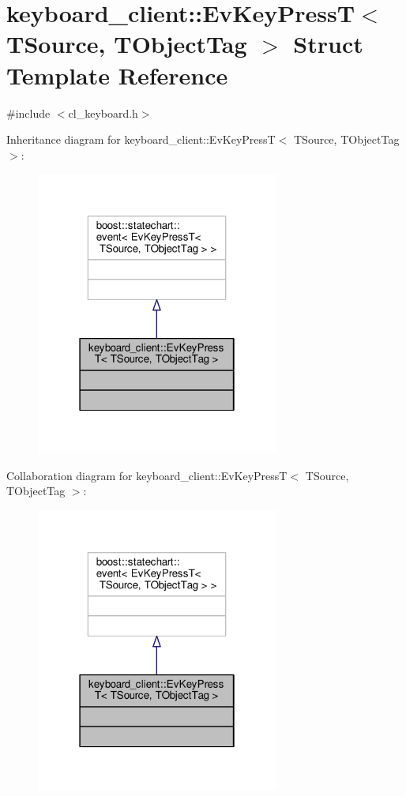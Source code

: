 \hypertarget{structkeyboard__client_1_1EvKeyPressT}{}\section{keyboard\+\_\+client\+:\+:Ev\+Key\+PressT$<$ T\+Source, T\+Object\+Tag $>$ Struct Template Reference}
\label{structkeyboard__client_1_1EvKeyPressT}


{\ttfamily \#include $<$cl\+\_\+keyboard.\+h$>$}



Inheritance diagram for keyboard\+\_\+client\+:\+:Ev\+Key\+PressT$<$ T\+Source, T\+Object\+Tag $>$\+:\nopagebreak
\begin{figure}[H]
\begin{center}
\leavevmode
\includegraphics[width=226pt]{structkeyboard__client_1_1EvKeyPressT__inherit__graph}
\end{center}
\end{figure}


Collaboration diagram for keyboard\+\_\+client\+:\+:Ev\+Key\+PressT$<$ T\+Source, T\+Object\+Tag $>$\+:\nopagebreak
\begin{figure}[H]
\begin{center}
\leavevmode
\includegraphics[width=226pt]{structkeyboard__client_1_1EvKeyPressT__coll__graph}
\end{center}
\end{figure}


